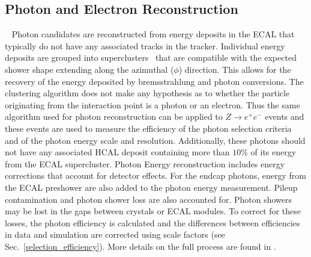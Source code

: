 \subsection{Photon and Electron Reconstruction}~\label{sec:PhotonAndElectronRECO}
Photon candidates are reconstructed from energy deposits in the ECAL that typically do not have any associated tracks in the tracker. Individual energy deposits are grouped into superclusters~\cite{Khachatryan:2015iwa} that are compatible with the expected shower shape extending along the azimuthal ($\phi$) direction. This allows for the recovery of the energy deposited by bremsstrahlung and photon conversions. The clustering algorithm does not make any hypothesis as to whether the particle originating from the interaction point is a photon or an electron. Thus the same algorithm used for photon reconstruction can be applied to $Z \rightarrow e^+e^-$ events and these events are used to
measure the efficiency of the photon selection criteria and of the photon energy scale and resolution. Additionally, these photons should not have any associated HCAL deposit containing more than $10\%$ of its energy from the ECAL supercluster. Photon Energy reconstruction includes energy corrections that account for detector effects. For the endcap photons, energy from the ECAL preshower are also added to the photon energy measurement. Pileup contamination and photon shower loss are also accounted for. Photon showers may be lost in the gaps between crystals or ECAL modules. To correct for these losses, the photon efficiency is calculated and the differences between efficiencies in data and simulation are corrected using scale factors (see Sec.~\ref{selection_efficiency}). More details on the full process are found in \cite{Mukherjee:2021wzi}. 



